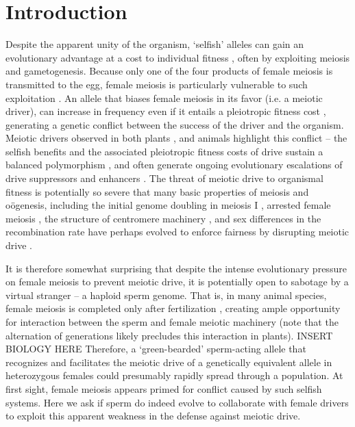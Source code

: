 \documentclass[12pt,letterpaper]{article}
\newcommand{\yb}[1]{{ \color{blue} #1}}
\begin{document}
\section*{Introduction}
Despite the apparent unity of the organism, `selfish' alleles can
gain an evolutionary advantage at a cost to  individual fitness
\citep{Burt2006}, often by exploiting meiosis and gametogenesis.
Because only one of the four products of female meiosis is transmitted to the egg, female meiosis is particularly vulnerable to such exploitation \citep{Sandler1957,Pardo-ManuelDeVillena2001a}. 
An allele that biases female meiosis in its favor (i.e. a meiotic driver), can increase in frequency even if it entails a pleiotropic fitness cost \citep{Prout1973}, generating a genetic conflict between the success of the driver and the organism.
Meiotic drivers observed in both plants
\citep{Buckler1999,Fishman2005,Fishman2008}, and animals
\citep{Agulnik1990,Wu2005,Pardo-ManuelDeVillena2001c} highlight this
conflict -- the selfish benefits and the associated
pleiotropic fitness costs of drive sustain a balanced polymorphism
\citep{Prout1973}, 
and often generate ongoing evolutionary escalations of drive suppressors and enhancers \citep{Dawe1996,Fishman2008}. 
The threat of meiotic drive to organismal fitness is potentially so
severe that many basic properties of
meiosis and o\"{o}genesis, including the initial genome doubling in
meiosis I \citep{Haig1991}, arrested female meiosis
\citep{Mira1998}, the structure of centromere machinery \citep{Malik2002a,Malik2009}, and sex differences in the recombination rate \citep{Haig2010,Brandvain2012} 
have perhaps evolved to enforce fairness by disrupting meiotic drive \citep{Rice2013}. \newline 

It is therefore somewhat surprising that despite the intense evolutionary pressure on female meiosis to prevent meiotic drive, 
it is potentially open to sabotage by a virtual stranger -- a haploid sperm genome.
That is, in many animal species, female meiosis is completed only after fertilization \citep{Masui_book}, 
	creating ample opportunity for interaction between the sperm and
	female meiotic machinery (note that the alternation of generations
	likely precludes this interaction in plants). 
\yb{INSERT BIOLOGY HERE}
Therefore, a `green-bearded' \citep{Gardner2010} sperm-acting allele that recognizes and facilitates the meiotic drive of a genetically equivalent allele in heterozygous females 
     could presumably rapidly spread through a population. 
At first sight, female meiosis appears primed for conflict caused by such selfish systems. 
Here we ask if sperm do indeed evolve to collaborate with female drivers to exploit this 
	apparent weakness in the defense against meiotic drive. \newline 
\end{document}
